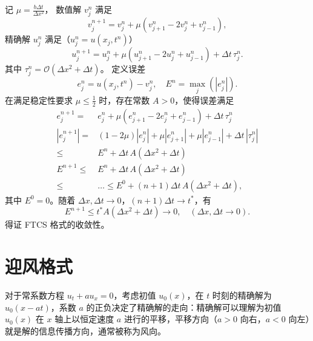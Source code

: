 \begin{solution*}
    记 $\mu = \frac{b \Delta t}{\Delta x^2}$，
    数值解 $v_j^n$ 满足
    \[
        v_j^{n+1} = v_j^n + \mu (v_{j+1}^n - 2 v_j^n + v_{j-1}^n),
    \]
    精确解 $u_j^n$ 满足（$u_j^n = u(x_j,t^n)$）
    \[
        u_j^{n+1} = u_j^n + \mu (u_{j+1}^n - 2 u_j^n + u_{j-1}^n) + \Delta t\, \tau_j^n.
    \]
    其中 $\tau_j^n = \mathcal{O}(\Delta x^2 + \Delta t)$。
    定义误差
    \[
        e_j^n = u(x_j,t^n) - v_j^n,\quad E^n = \max_j(|e_j^n|).
    \]
    在满足稳定性要求 $\mu \le \frac12$ 时，存在常数 $A>0$，使得误差满足
    \begin{align*}
        e_j^{n+1} ={}   & e_j^n + \mu (e_{j+1}^n - 2 e_j^n + e_{j-1}^n) + \Delta t\, \tau_j^n          \\
        |e_j^{n+1}| ={} & (1-2\mu) |e_j^n| + \mu |e_{j+1}^n| + \mu |e_{j-1}^n| + \Delta t\, |\tau_j^n| \\
        \le{}           & E^n + \Delta t\, A(\Delta x^2 + \Delta t)                                    \\
        E^{n+1} \le{}   & E^n + \Delta t\, A(\Delta x^2 + \Delta t)                                    \\
        \le{}           & \dots \le E^0 + (n+1)\Delta t\, A(\Delta x^2 + \Delta t),
    \end{align*}
    其中 $E^0 = 0$。随着 $\Delta x,\Delta t \to 0$，$(n+1) \Delta t \to t^*$，有
    \[
        E^{n+1} \le t^* A(\Delta x^2 + \Delta t) \to 0, \quad (\Delta x,\Delta t \to 0).
    \]
    得证 FTCS 格式的收敛性。
\end{solution*}


\section{迎风格式}

对于常系数方程 $u_t + a u_x = 0$，考虑初值 $u_0(x)$，在 $t$ 时刻的精确解为 $u_0(x - a t)$，系数 $a$ 的正负决定了精确解的走向：精确解可以理解为初值 $u_0(x)$ 在 $x$ 轴上以恒定速度 $a$ 进行的平移，平移方向（$a>0$ 向右，$a<0$ 向左）就是解的信息传播方向，通常被称为风向。

